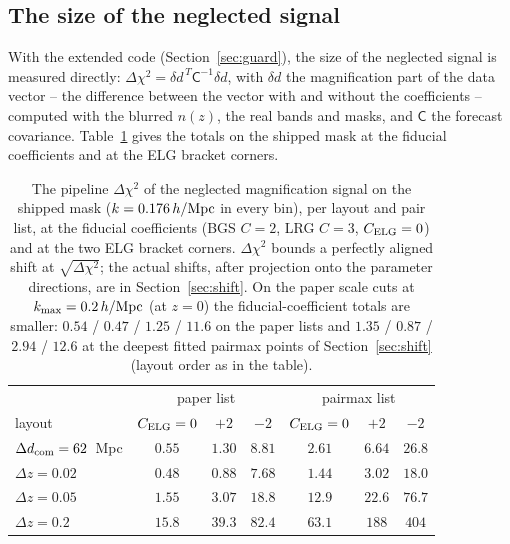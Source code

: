 \documentclass[11pt]{article}
\newcommand{\kmax}{k_{\rm max}}
\newcommand{\hMpc}{\,h/{\rm Mpc}}
\newcommand{\dcom}{$\Delta d_{\rm com} = 62$~Mpc}
\begin{document}
\subsection{The size of the neglected signal}
\label{sec:estimate}

With the extended code (Section~\ref{sec:guard}), the size of the
neglected signal is measured directly:
$\Delta\chi^2 = \delta d^{\,T} \mathsf{C}^{-1} \delta d$, with
$\delta d$ the magnification part of the data vector -- the
difference between the vector with and without the coefficients --
computed with the blurred $n(z)$, the real bands and masks, and
$\mathsf{C}$ the forecast covariance.  Table~\ref{tab:dchi2} gives
the totals on the shipped mask at the fiducial coefficients and at
the ELG bracket corners.

\begin{table}[tbp]
  \centering
  \small
  \begin{tabular}{lcccccc}
    \toprule
    & \multicolumn{3}{c}{paper list} & \multicolumn{3}{c}{pairmax list} \\
    layout & $C_{\rm ELG} = 0$ & $+2$ & $-2$ & $C_{\rm ELG} = 0$ & $+2$ & $-2$ \\
    \midrule
    \dcom{}           & $0.55$ & $1.30$ & $8.81$ & $2.61$ & $6.64$ & $26.8$ \\
    $\Delta z = 0.02$ & $0.48$ & $0.88$ & $7.68$ & $1.44$ & $3.02$ & $18.0$ \\
    $\Delta z = 0.05$ & $1.55$ & $3.07$ & $18.8$ & $12.9$ & $22.6$ & $76.7$ \\
    $\Delta z = 0.2$  & $15.8$ & $39.3$ & $82.4$ & $63.1$ & $188$  & $404$  \\
    \bottomrule
  \end{tabular}
  \caption{The pipeline $\Delta\chi^2$ of the neglected magnification
    signal on the shipped mask ($k = 0.176\hMpc$ in every bin), per
    layout and pair list, at the fiducial coefficients
    (BGS $C = 2$, LRG $C = 3$, $C_{\rm ELG} = 0$) and at the two ELG
    bracket corners.  $\Delta\chi^2$ bounds a perfectly aligned shift
    at $\sqrt{\Delta\chi^2}$; the actual shifts, after projection
    onto the parameter directions, are in Section~\ref{sec:shift}.
    On the paper scale cuts at $\kmax = 0.2\hMpc$ (at $z = 0$) the
    fiducial-coefficient totals are smaller: $0.54$ / $0.47$ / $1.25$
    / $11.6$ on the paper lists and $1.35$ / $0.87$ / $2.94$ / $12.6$
    at the deepest fitted pairmax points of Section~\ref{sec:shift}
    (layout order as in the table).}
  \label{tab:dchi2}
\end{table}
\end{document}
